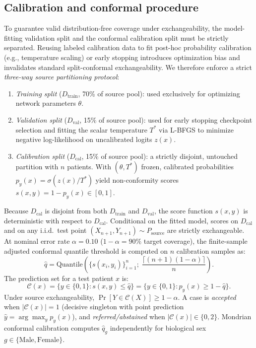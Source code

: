 \documentclass[journal]{IEEEtran}
\begin{document}
\subsection{Calibration and conformal procedure}\label{sec:conformal_theory}
To guarantee valid distribution-free coverage under exchangeability, the model-fitting validation split and the conformal calibration split must be strictly separated. Reusing labeled calibration data to fit post-hoc probability calibration (e.g., temperature scaling) or early stopping introduces optimization bias and invalidates standard split-conformal exchangeability. We therefore enforce a strict \emph{three-way source partitioning protocol}:
\begin{enumerate}
\item \emph{Training split} ($D_{\mathrm{train}}$, 70\% of source pool): used exclusively for optimizing network parameters $\theta$.
\item \emph{Validation split} ($D_{\mathrm{val}}$, 15\% of source pool): used for early stopping checkpoint selection and fitting the scalar temperature $T^*$ via L-BFGS to minimize negative log-likelihood on uncalibrated logits $z(x)$.
\item \emph{Calibration split} ($D_{\mathrm{cal}}$, 15\% of source pool): a strictly disjoint, untouched partition with $n$ patients. With $(\theta, T^*)$ frozen, calibrated probabilities $p_y(x) = \sigma(z(x)/T^*)$ yield non-conformity scores $s(x,y) = 1 - p_y(x) \in [0, 1]$.
\end{enumerate}
Because $D_{\mathrm{cal}}$ is disjoint from both $D_{\mathrm{train}}$ and $D_{\mathrm{val}}$, the score function $s(x,y)$ is deterministic with respect to $D_{\mathrm{cal}}$. Conditional on the fitted model, scores on $D_{\mathrm{cal}}$ and on any i.i.d.\ test point $(X_{n+1}, Y_{n+1}) \sim P_{\mathrm{source}}$ are strictly exchangeable.
At nominal error rate $\alpha=0.10$ ($1-\alpha=90\%$ target coverage), the finite-sample adjusted conformal quantile threshold is computed on $n$ calibration samples as:
\begin{equation}
\hat{q} = \mathrm{Quantile}\left(\{s(x_i, y_i)\}_{i=1}^n; \; \frac{\lceil (n+1)(1-\alpha) \rceil}{n}\right).
\end{equation}
The prediction set for a test patient $x$ is:
\begin{equation}
\mathcal{C}(x) = \{y \in \{0, 1\} : s(x, y) \le \hat{q}\} = \{y \in \{0, 1\} : p_y(x) \ge 1 - \hat{q}\}.
\end{equation}
Under source exchangeability, $\Pr[Y \in \mathcal{C}(X)] \ge 1 - \alpha$. A case is \emph{accepted} when $|\mathcal{C}(x)|=1$ (decisive singleton with point prediction $\hat{y} = \arg\max_y p_y(x)$), and \emph{referred/abstained} when $|\mathcal{C}(x)| \in \{0, 2\}$. Mondrian conformal calibration computes $\hat{q}_g$ independently for biological sex $g \in \{\mathrm{Male}, \mathrm{Female}\}$.
\end{document}
